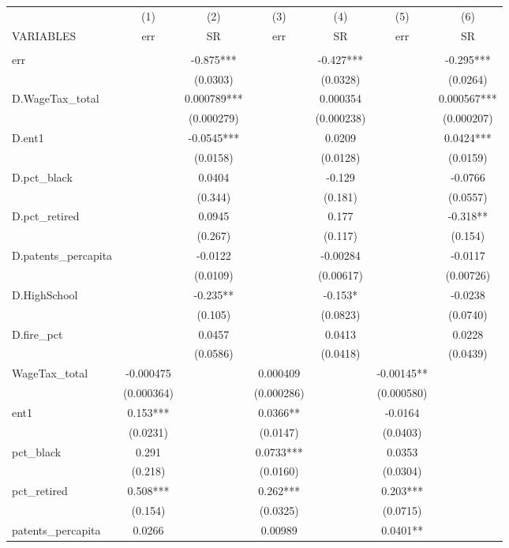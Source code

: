 \begin{tabular}{lcccccc} \hline
 & (1) & (2) & (3) & (4) & (5) & (6) \\
VARIABLES & err & SR & err & SR & err & SR \\ \hline
 &  &  &  &  &  &  \\
err &  & -0.875*** &  & -0.427*** &  & -0.295*** \\
 &  & (0.0303) &  & (0.0328) &  & (0.0264) \\
D.WageTax\_total &  & 0.000789*** &  & 0.000354 &  & 0.000567*** \\
 &  & (0.000279) &  & (0.000238) &  & (0.000207) \\
D.ent1 &  & -0.0545*** &  & 0.0209 &  & 0.0424*** \\
 &  & (0.0158) &  & (0.0128) &  & (0.0159) \\
D.pct\_black &  & 0.0404 &  & -0.129 &  & -0.0766 \\
 &  & (0.344) &  & (0.181) &  & (0.0557) \\
D.pct\_retired &  & 0.0945 &  & 0.177 &  & -0.318** \\
 &  & (0.267) &  & (0.117) &  & (0.154) \\
D.patents\_percapita &  & -0.0122 &  & -0.00284 &  & -0.0117 \\
 &  & (0.0109) &  & (0.00617) &  & (0.00726) \\
D.HighSchool &  & -0.235** &  & -0.153* &  & -0.0238 \\
 &  & (0.105) &  & (0.0823) &  & (0.0740) \\
D.fire\_pct &  & 0.0457 &  & 0.0413 &  & 0.0228 \\
 &  & (0.0586) &  & (0.0418) &  & (0.0439) \\
WageTax\_total & -0.000475 &  & 0.000409 &  & -0.00145** &  \\
 & (0.000364) &  & (0.000286) &  & (0.000580) &  \\
ent1 & 0.153*** &  & 0.0366** &  & -0.0164 &  \\
 & (0.0231) &  & (0.0147) &  & (0.0403) &  \\
pct\_black & 0.291 &  & 0.0733*** &  & 0.0353 &  \\
 & (0.218) &  & (0.0160) &  & (0.0304) &  \\
pct\_retired & 0.508*** &  & 0.262*** &  & 0.203*** &  \\
 & (0.154) &  & (0.0325) &  & (0.0715) &  \\
patents\_percapita & 0.0266 &  & 0.00989 &  & 0.0401** &  \\

\end{tabular}
